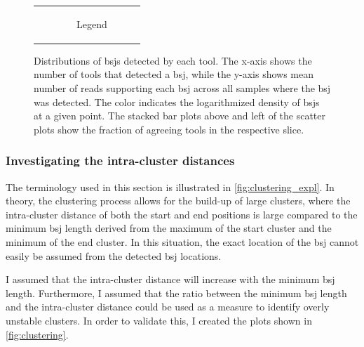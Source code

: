\begin{figure}[ht]
\begin{tabular}{cc}
                                                                                                                                 &
               \begin{subfigure}{.4\textwidth}	     \centering
                       \caption{Legend}

                   \end{subfigure}\end{tabular} \caption{Distributions of
        \gls{bsj}s detected by
        each tool.
        The x-axis shows the number of tools that detected a \gls{bsj}, while the
        y-axis shows mean number of reads supporting each \gls{bsj} across all samples
        where the \gls{bsj} was detected.
        The color indicates the logarithmized density of \gls{bsj}s at a given point.
        The stacked bar plots above and left of the scatter plots show the fraction of
        agreeing tools in the respective slice.
    }
    \label{fig:detection_density}
\end{figure}

\subsubsection{Investigating the intra-cluster distances}

\noindent{}

The terminology used in this section is illustrated in
\cref{fig:clustering_expl}.
In theory, the clustering process allows for the build-up of large clusters,
where the intra-cluster distance of both the start and end positions is large
compared to the minimum \gls{bsj} length derived from the maximum of the start
cluster and the minimum of the end cluster.
In this situation, the exact location of the \gls{bsj} cannot easily be assumed
from the detected \gls{bsj} locations.

I assumed that the intra-cluster distance will increase with the minimum
\gls{bsj} length.
Furthermore, I assumed that the ratio between the minimum \gls{bsj} length and
the intra-cluster distance could be used as a measure to identify overly
unstable clusters.
In order to validate this, I created the plots shown in \cref{fig:clustering}.

